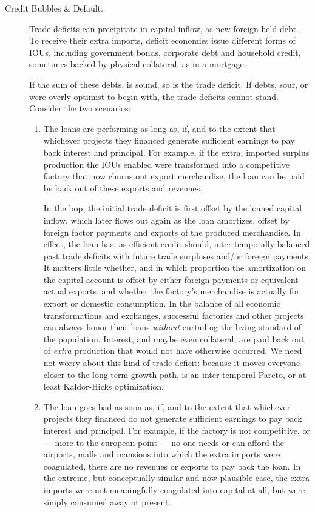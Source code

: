 \begin{description}
	\item[Credit Bubbles \& Default.]  Trade deficits can precipitate in capital inflow, as new foreign-held debt.
	To receive their extra imports, deficit economies issue different forms of IOUs, including government bonds, corporate debt and household credit, sometimes backed by physical collateral, as in a mortgage.

	If the sum of these debts, is sound, so is the trade deficit.
	If debts, sour, or were overly optimist to begin with, the trade deficits cannot stand.
	Consider the two scenarios:
	\begin{enumerate}
		\item The loans are performing as long as, if, and to the extent that whichever projects they financed generate sufficient earnings to pay back interest and principal.
		For example, if the extra, imported surplus production the IOUs enabled were transformed into a competitive factory that now churns out export merchandise, the loan can be paid be back out of these exports and revenues.

		In the \gls{bop}, the initial trade deficit is first offset by the loaned capital inflow, which later flows out again as the loan amortizes, offset by foreign factor payments and exports of the produced merchandise.
		In effect, the loan has, as efficient credit should, inter-temporally balanced past trade deficits with future trade surpluses and/or foreign payments.
		It matters little whether, and in which proportion the amortization on the capital account is offset by either foreign payments or equivalent actual exports, and whether the factory's merchandise is actually for export or domestic consumption.
		In the balance of all economic transformations and exchanges, successful factories and other projects can always honor their loans \emph{without} curtailing the living standard of the population.
		Interest, and maybe even collateral, are paid back out of \emph{extra} production that would not have otherwise occurred.
		We need not worry about this kind of trade deficit:
		because it moves everyone closer to the long-term growth path, is an inter-temporal Pareto, or at least Kaldor-Hicks optimization.

		\item The loan goes bad as soon as, if, and to the extent that whichever projects they financed do not generate sufficient earnings to pay back interest and principal.
		For example, if the factory is not competitive, or --- more to the european point --- no one needs or can afford the airports, malls and mansions into which the extra imports were coagulated, there are no revenues or exports to pay back the loan.
		In the extreme, but conceptually similar and now plausible case, the extra imports were not meaningfully coagulated into capital at all, but were simply consumed away at present.


\end{enumerate}
\end{description}

